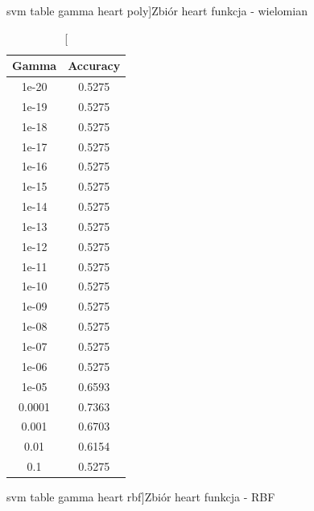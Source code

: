 \documentclass{classrep}
\begin{document}
{{\begin{table}[!htbp]
\begin{minipage}{.35\textwidth}
                    \caption
                    [svm table gamma heart poly]{Zbiór heart funkcja - wielomian}
                    \label{svm_table_gamma_heart_poly}
                \end{minipage}
                \hfill
                \begin{minipage}{.3\textwidth}
                    \centering
                    \begin{tabular}{|c|c|}
                        \hline
                        Gamma & Accuracy \\ \hline
                        1e-20 & 0.5275 \\ \hline
                        1e-19 & 0.5275 \\ \hline
                        1e-18 & 0.5275 \\ \hline
                        1e-17 & 0.5275 \\ \hline
                        1e-16 & 0.5275 \\ \hline
                        1e-15 & 0.5275 \\ \hline
                        1e-14 & 0.5275 \\ \hline
                        1e-13 & 0.5275 \\ \hline
                        1e-12 & 0.5275 \\ \hline
                        1e-11 & 0.5275 \\ \hline
                        1e-10 & 0.5275 \\ \hline
                        1e-09 & 0.5275 \\ \hline
                        1e-08 & 0.5275 \\ \hline
                        1e-07 & 0.5275 \\ \hline
                        1e-06 & 0.5275 \\ \hline
                        1e-05 & 0.6593 \\ \hline
                        0.0001 & 0.7363 \\ \hline
                        0.001 & 0.6703 \\ \hline
                        0.01 & 0.6154 \\ \hline
                        0.1 & 0.5275 \\ \hline
                    \end{tabular}
                    \caption
                    [svm table gamma heart rbf]{Zbiór heart funkcja - RBF}
                    \label{svn_table_gamma_heart_rbf}
                \end{minipage}

\end{table}}}
\end{document}
